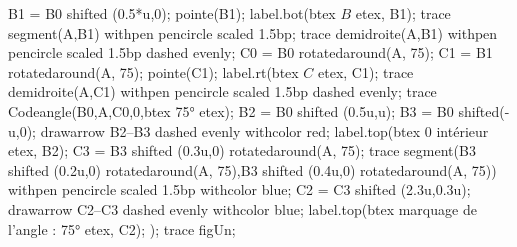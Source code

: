 \begin{changemargin}{0mm}{-20mm}
\begin{methode}
\begin{Geometrie}[CoinHD={(8.5u,4.5u)}]
                B1 = B0 shifted (0.5*u,0);
                pointe(B1);
                label.bot(btex $B$ etex, B1);
                trace segment(A,B1) withpen pencircle scaled 1.5bp;
                trace demidroite(A,B1) withpen pencircle scaled 1.5bp dashed evenly;
                C0 = B0 rotatedaround(A, 75);
                C1 = B1 rotatedaround(A, 75);
                pointe(C1);
                label.rt(btex $C$ etex, C1);
                trace demidroite(A,C1) withpen pencircle scaled 1.5bp dashed evenly;
                trace Codeangle(B0,A,C0,0,btex \ang{75} etex);
                B2 = B0 shifted (0.5u,u);
                B3 = B0 shifted(-u,0);
                drawarrow B2--B3 dashed evenly withcolor red;
                label.top(btex {\red $0$ intérieur} etex, B2);
                C3 = B3 shifted (0.3u,0) rotatedaround(A, 75);
                trace segment(B3 shifted (0.2u,0) rotatedaround(A, 75),B3 shifted (0.4u,0) rotatedaround(A, 75)) withpen pencircle scaled 1.5bp withcolor blue;
                C2 = C3 shifted (2.3u,0.3u);
                drawarrow C2--C3 dashed evenly withcolor blue;
                label.top(btex {\blue marquage de l'angle : \ang{75}} etex, C2);
            );
            trace figUn;
        \end{Geometrie}        
    \end{methode}
\end{changemargin}
\vspace*{-20mm}
